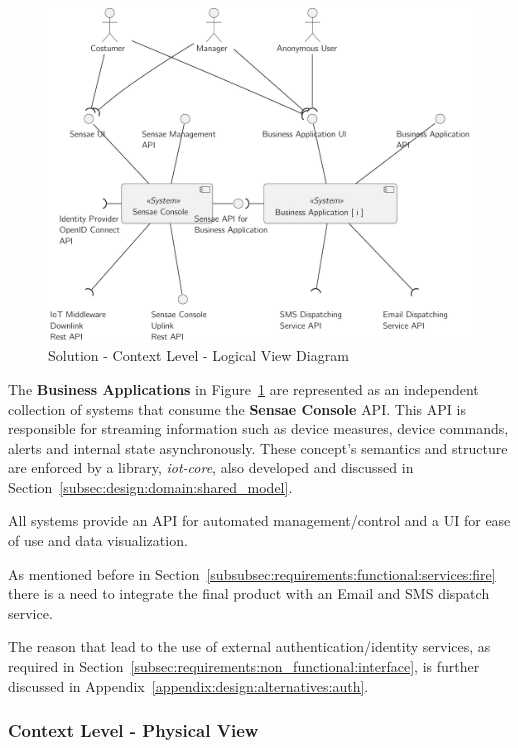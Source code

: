 \begin{figure}[H]
   \centering
   \includegraphics[page=1,width=0.8\columnwidth]{assets/diagrams/design/architectural/level1/logical-view.pdf}
   \caption[Solution - Context Level - Logical View Diagram]{Solution - Context Level - Logical View Diagram}
   \label{fig:design:architecture:context:logical:diagram}
\end{figure}

The \textbf{Business Applications} in Figure~\ref{fig:design:architecture:context:logical:diagram} are represented as an independent collection of systems that consume the \textbf{Sensae Console} \gls{API}. This \gls{API} is responsible for streaming information such as device measures, device commands, alerts and internal state asynchronously. These concept's semantics and structure are enforced by a library, \textit{iot-core}, also developed and discussed in Section~\ref{subsec:design:domain:shared_model}.

All systems provide an \gls{API} for automated management/control and a \gls{UI} for ease of use and data visualization.

As mentioned before in Section~\ref{subsubsec:requirements:functional:services:fire} there is a need to integrate the final product with an Email and SMS dispatch service.

The reason that lead to the use of external authentication/identity services, as required in Section~\ref{subsec:requirements:non_functional:interface}, is further discussed in Appendix~\ref{appendix:design:alternatives:auth}.

\subsubsection{Context Level - Physical View}
\label{subsubsec:design:architecture:context:physical}

